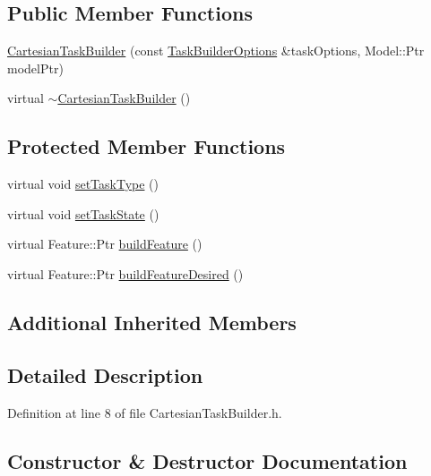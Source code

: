 \subsection*{Public Member Functions}
\begin{DoxyCompactItemize}
\item 
\hyperlink{classocra_1_1CartesianTaskBuilder_ad78453b86c3777783c94098967426bad}{Cartesian\+Task\+Builder} (const \hyperlink{classocra_1_1TaskBuilderOptions}{Task\+Builder\+Options} \&task\+Options, Model\+::\+Ptr model\+Ptr)
\item 
virtual \hyperlink{classocra_1_1CartesianTaskBuilder_aecc30a79dfbeaf935d302a3f1e2c3fac}{$\sim$\+Cartesian\+Task\+Builder} ()
\end{DoxyCompactItemize}
\subsection*{Protected Member Functions}
\begin{DoxyCompactItemize}
\item 
virtual void \hyperlink{classocra_1_1CartesianTaskBuilder_a679842b95d6f7296a466636fd21bbbb8}{set\+Task\+Type} ()
\item 
virtual void \hyperlink{classocra_1_1CartesianTaskBuilder_a9e3175e5792c5ed9a7e3febbe458d21c}{set\+Task\+State} ()
\item 
virtual Feature\+::\+Ptr \hyperlink{classocra_1_1CartesianTaskBuilder_a58c8e4a299db03180c058eefcd711052}{build\+Feature} ()
\item 
virtual Feature\+::\+Ptr \hyperlink{classocra_1_1CartesianTaskBuilder_a308b204435c4063991d8101c0a8c512c}{build\+Feature\+Desired} ()
\end{DoxyCompactItemize}
\subsection*{Additional Inherited Members}


\subsection{Detailed Description}


Definition at line 8 of file Cartesian\+Task\+Builder.\+h.



\subsection{Constructor \& Destructor Documentation}
